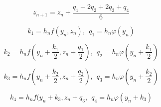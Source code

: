\documentclass[14pt, a4paper]{extarticle}
\begin{document}
\begin{equation*}
	z_{n+1} = z_n + \frac{q_1 + 2q_2 + 2q_3 + q_4}{6}
\end{equation*}

\begin{equation*}
	k_1 = h_n f(y_n, z_n), ~~q_1 = h_n \varphi (y_n)
\end{equation*}

\begin{equation*}
	k_2 = h_n f (y_n + \frac{k_1}{2}, z_n + \frac{q_1}{2}),~~ q_2 = h_n \varphi(y_n + \frac{k_1}{2})
\end{equation*}

\begin{equation*}
	k_3 = h_n f (y_n + \frac{k_2}{2}, z_n + \frac{q_2}{2}), ~~q_3 = h_n \varphi(y_n + \frac{k_2}{2})
\end{equation*}

\begin{equation*}
	k_4 = h_n f (y_n + k_3, z_n + q_3, ~~q_4 = h_n \varphi(y_n + k_3)
\end{equation*}

\newpage
\end{document}
